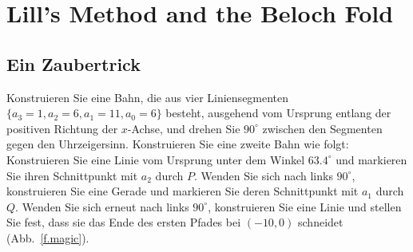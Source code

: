 
\chapter{Lill's Method and the Beloch Fold}\label{c.origami-cube}


\section{Ein Zaubertrick}\label{s.magic}

Konstruieren Sie eine Bahn, die aus vier Liniensegmenten $\{a_3=1,a_2=6,a_1=11,a_0=6\}$ besteht, ausgehend vom Ursprung entlang der positiven Richtung der $x$-Achse, und drehen Sie $90^\circ$ zwischen den Segmenten gegen den Uhrzeigersinn. Konstruieren Sie eine zweite Bahn wie folgt: Konstruieren Sie eine Linie vom Ursprung unter dem Winkel $63.4^\circ$ und markieren Sie ihren Schnittpunkt mit $a_2$ durch $P$. Wenden Sie sich nach links $90^\circ$, konstruieren Sie eine Gerade und markieren Sie deren Schnittpunkt mit $a_1$ durch $Q$. Wenden Sie sich erneut nach links $90^\circ$, konstruieren Sie eine Linie und stellen Sie fest, dass sie das Ende des ersten Pfades bei $(-10,0)$ schneidet (Abb.~\ref{f.magic}).

